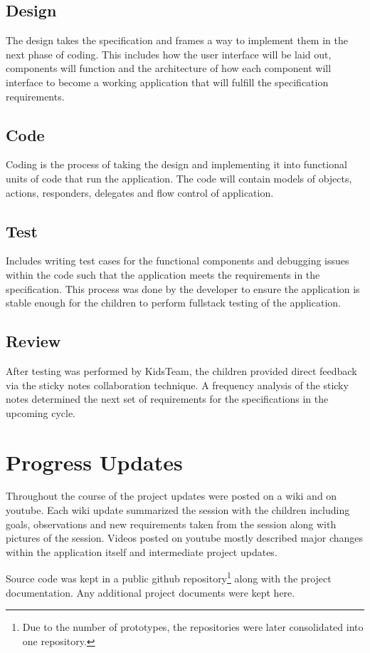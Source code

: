 \subsection{Design}\label{sec:designphase}
 The design takes the specification and frames a way to implement them in the next phase of coding. This includes how the user interface will be laid out, components will function and the architecture of how each component will interface to become a working application that will fulfill the specification requirements.  

\subsection{Code}\label{sec:codephase}
Coding is the process of taking the design and implementing it into functional units of code that run the application. The code will contain models of objects, actions, responders, delegates and flow control of application.

\subsection{Test}\label{sec:testphase}

Includes writing test cases for the functional components and debugging issues within the code such that the application meets the requirements in the specification. This process was done by the developer to ensure the application is stable enough for the children to perform fullstack testing of the application.

\subsection{Review}\label{sec:reviewphase}

After testing was performed by KidsTeam, the children provided direct feedback via the sticky notes collaboration technique. A frequency analysis of the sticky notes determined the next set of requirements for the specifications in the upcoming cycle. 

\section{Progress Updates}
Throughout the course of the project updates were posted on a wiki and on youtube. Each wiki update summarized the session with the children including goals, observations and new requirements taken from the session along with pictures of the session. Videos posted on youtube mostly described major changes within the application itself and intermediate project updates.

Source code was kept in a public github repository\footnote{Due to the number of prototypes, the repositories were later consolidated into one repository.} along with the project documentation. Any additional project documents were kept here. 

